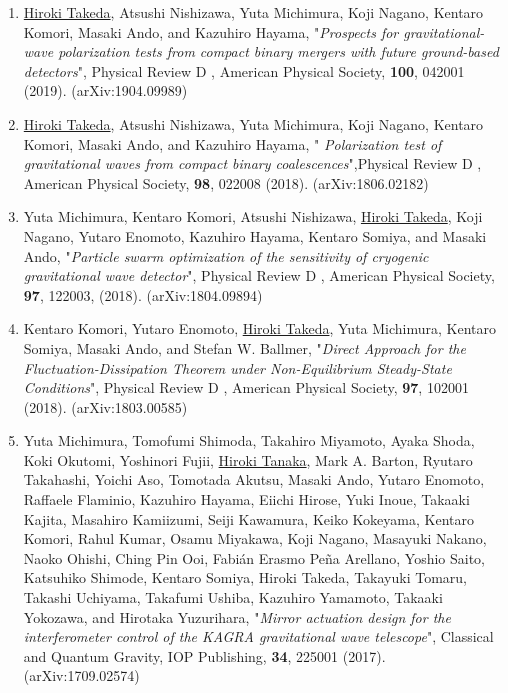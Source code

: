 \documentclass[uplatex, 11pt]{jsarticle}
\begin{document}
\begin{enumerate}
\item \uline{Hiroki Takeda}, Atsushi Nishizawa, Yuta Michimura, Koji Nagano, Kentaro Komori, Masaki Ando, and Kazuhiro Hayama, "\emph{Prospects for gravitational-wave polarization tests from compact binary mergers with future ground-based detectors}", Physical Review D , American Physical Society, {\bf 100}, 042001 (2019). (arXiv:1904.09989)\\

\item \uline{Hiroki Takeda}, Atsushi Nishizawa, Yuta Michimura, Koji Nagano, Kentaro Komori, Masaki Ando, and Kazuhiro Hayama, " \emph{Polarization test of gravitational waves from compact binary coalescences}",Physical Review D , American Physical Society, {\bf 98}, 022008 (2018). (arXiv:1806.02182)\\

\item Yuta Michimura, Kentaro Komori, Atsushi Nishizawa, \uline{Hiroki Takeda}, Koji Nagano, Yutaro Enomoto, Kazuhiro Hayama, Kentaro Somiya, and Masaki Ando, "\emph{Particle swarm optimization of the sensitivity of cryogenic gravitational wave detector}", Physical Review D , American Physical Society, {\bf 97}, 122003, (2018). (arXiv:1804.09894)\\

\item Kentaro Komori, Yutaro Enomoto, \uline{Hiroki Takeda}, Yuta Michimura, Kentaro Somiya, Masaki Ando, and Stefan W. Ballmer, "\emph{Direct Approach for the Fluctuation-Dissipation Theorem under Non-Equilibrium Steady-State Conditions}", Physical Review D , American Physical Society, {\bf 97}, 102001 (2018). (arXiv:1803.00585)\\

\item Yuta Michimura, Tomofumi Shimoda, Takahiro Miyamoto, Ayaka Shoda, Koki Okutomi, Yoshinori Fujii, \uline{Hiroki Tanaka}, Mark A. Barton, Ryutaro Takahashi, Yoichi Aso, Tomotada Akutsu, Masaki Ando, Yutaro Enomoto, Raffaele Flaminio, Kazuhiro Hayama, Eiichi Hirose, Yuki Inoue, Takaaki Kajita, Masahiro Kamiizumi, Seiji Kawamura, Keiko Kokeyama, Kentaro Komori, Rahul Kumar, Osamu Miyakawa, Koji Nagano, Masayuki Nakano, Naoko Ohishi, Ching Pin Ooi, Fabián Erasmo Peña Arellano, Yoshio Saito, Katsuhiko Shimode, Kentaro Somiya, Hiroki Takeda, Takayuki Tomaru, Takashi Uchiyama, Takafumi Ushiba, Kazuhiro Yamamoto, Takaaki Yokozawa, and Hirotaka Yuzurihara, "\emph{Mirror actuation design for the interferometer control of the KAGRA gravitational wave telescope}", Classical and Quantum Gravity, IOP Publishing, {\bf 34}, 225001 (2017). (arXiv:1709.02574)
\end{enumerate}
\end{document}
